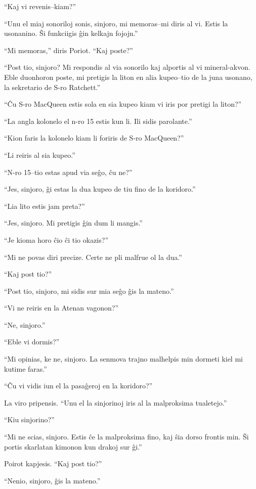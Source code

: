``Kaj vi revenis--kiam?''

``Unu el miaj sonoriloj sonis, sinjoro, mi memoras--mi diris al vi. Estis la usonanino. Ŝi funkciigis ĝin kelkajn fojojn.''

``Mi memoras,'' diris Poriot. ``Kaj poste?''

``Post tio, sinjoro? Mi respondis al via sonorilo kaj alportis al vi mineral-akvon. Eble duonhoron poste, mi pretigis la liton en alia kupeo--tio de la juna usonano, la sekretario de S-ro Ratchett.''

``Ĉu S-ro MacQueen estis sola en sia kupeo kiam vi iris por pretigi la liton?''

``La angla kolonelo el n-ro 15 estis kun li. Ili sidis parolante.''

``Kion faris la kolonelo kiam li foriris de S-ro MacQueen?''

``Li reiris al sia kupeo.''

``N-ro 15--tio estas apud via seĝo, ĉu ne?''

``Jes, sinjoro, ĝi estas la dua kupeo de tiu fino de la koridoro.''

``Lia lito estis jam preta?''

``Jes, sinjoro. Mi pretigis ĝin dum li mangis.''

``Je kioma horo ĉio ĉi tio okazis?''

``Mi ne povas diri precize. Certe ne pli malfrue ol la dua.''

``Kaj post tio?''

``Post tio, sinjoro, mi sidis sur mia seĝo ĝis la mateno.''

``Vi ne reiris en la Atenan vagonon?''

``Ne, sinjoro.''

``Eble vi dormis?''

``Mi opinias, ke ne, sinjoro. La senmova trajno malhelpis min dormeti kiel mi kutime faras.''

``Ĉu vi vidis iun el la pasaĝeroj en la koridoro?''

La viro pripensis. ``Unu el la sinjorinoj iris al la malproksima tualetejo.''

``Kiu sinjorino?''

``Mi ne scias, sinjoro. Estis ĉe la malproksima fino, kaj ŝia dorso frontis min. Ŝi portis skarlatan kimonon kun drakoj sur ĝi.''

Poirot kapjesis. ``Kaj post tio?''

``Nenio, sinjoro, ĝis la mateno.''

